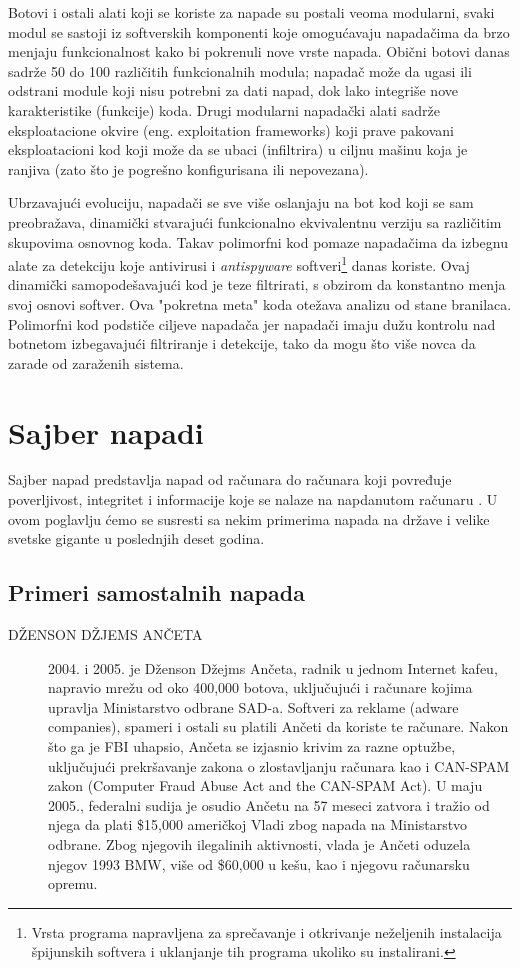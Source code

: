 \documentclass[a4paper]{article}
\theoremstyle{break}
\begin{document}
{Botovi i ostali alati koji se koriste za napade su postali veoma modularni, svaki modul se sastoji iz softverskih komponenti koje omogućavaju napadačima da brzo menjaju funkcionalnost kako bi pokrenuli nove vrste napada. Obični botovi danas sadrže 50 do 100 različitih funkcionalnih modula; napadač može da ugasi ili odstrani module koji nisu potrebni za dati napad, dok lako integriše nove karakteristike (funkcije) koda. Drugi modularni napadački alati sadrže eksploatacione okvire (eng. exploitation  frameworks) koji prave pakovani eksploatacioni kod koji može da se ubaci (infiltrira) u ciljnu mašinu koja je ranjiva (zato što je pogrešno konfigurisana ili nepovezana).

Ubrzavajući evoluciju, napadači se sve više oslanjaju na bot kod koji se sam preobražava, dinamički stvarajući funkcionalno ekvivalentnu verziju sa različitim skupovima osnovnog koda. Takav polimorfni kod pomaze napadačima da izbegnu alate za detekciju koje antivirusi i \textit{antispyware} softveri\footnote{Vrsta programa napravljena za sprečavanje i otkrivanje neželjenih instalacija špijunskih softvera i uklanjanje tih programa ukoliko su instalirani.} danas koriste. Ovaj dinamički samopodešavajući kod je teze filtrirati, s obzirom da konstantno menja svoj osnovi softver. Ova "pokretna meta" koda otežava analizu od stane branilaca. Polimorfni kod podstiče ciljeve napadača jer napadači imaju dužu kontrolu nad botnetom izbegavajući filtriranje i detekcije, tako da mogu što više novca da zarade od zaraženih sistema.

\section{Sajber napadi}
\label{sec:sajber_napadi}

Sajber napad predstavlja napad od računara do računara koji povređuje poverljivost, integritet i informacije koje se nalaze na napdanutom računaru \cite{knjiga}. U ovom poglavlju ćemo se susresti sa nekim primerima napada na države i velike svetske gigante u poslednjih deset godina. 

\subsection{Primeri samostalnih napada}
\label{subsec:primeri_samo_napada}

\begin{description}
\item[DŽENSON DŽJEMS ANČETA] 2004. i 2005. je Dženson Džejms Ančeta, radnik u jednom Internet kafeu, napravio mrežu od oko 400,000 botova, uključujući i računare kojima upravlja Ministarstvo odbrane SAD-a. Softveri za reklame (adware companies), spameri i ostali su platili Ančeti da koriste te računare. Nakon što ga je FBI uhapsio, Ančeta se izjasnio krivim za razne optužbe, uključujući prekršavanje zakona o zlostavljanju računara kao i CAN-SPAM zakon (Computer Fraud Abuse Act and the CAN-SPAM Act). U maju 2005., federalni sudija je osudio Ančetu na 57 meseci zatvora i tražio od njega da plati \$15,000 američkoj Vladi zbog napada na Ministarstvo odbrane. Zbog njegovih ilegalinih aktivnosti, vlada je Ančeti oduzela njegov 1993 BMW, više od \$60,000 u kešu, kao i njegovu računarsku opremu.


\end{description}}
\end{document}
